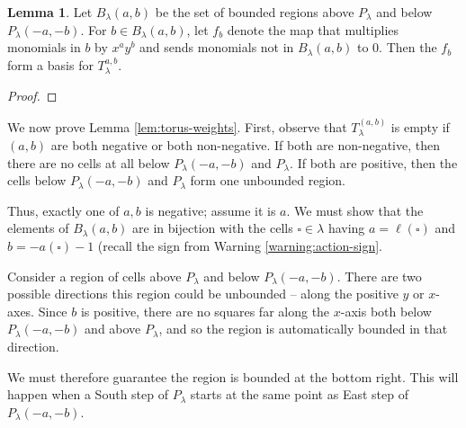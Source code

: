 \documentclass{amsart}[12pt]
\theoremstyle{definition}
\newtheorem{lemma}[dummy]{Lemma}
\begin{document}
\begin{lemma} Let $B_\lambda(a,b)$ be the set of bounded regions above $P_\lambda$ and below $P_\lambda(-a,-b)$.  For $b\in B_\lambda(a,b)$, let $f_b$ denote the map that multiplies monomials in $b$ by $x^ay^b$ and sends monomials not in $B_\lambda(a,b)$ to $0$.  Then the $f_b$ form a basis for $T_\lambda^{a,b}$.
\end{lemma}

\begin{proof}


\end{proof}


We now prove Lemma \ref{lem:torus-weights}.  First, observe that $T_\lambda^{(a,b)}$ is empty if $(a,b)$ are both negative or both non-negative.  If both are non-negative, then there are no cells at all below $P_\lambda(-a,-b)$ and $P_\lambda$.  If both are positive, then the cells below $P_\lambda(-a,-b)$ and $P_\lambda$ form one unbounded region.  



Thus, exactly one of $a,b$ is negative; assume it is $a$.  We must show that the elements of $B_\lambda(a,b)$ are in bijection with the cells $\square\in\lambda$ having  $a=\ell(\square)$ and $b=-a(\square)-1$ (recall the sign from Warning \ref{warning:action-sign}.

Consider a region of cells above $P_\lambda$ and below $P_\lambda(-a,-b)$.  There are two possible directions this region could be unbounded -- along the positive $y$ or $x$-axes.  Since $b$ is positive, there are no squares far along the $x$-axis both below $P_\lambda(-a,-b)$  and above $P_\lambda$, and so the region is automatically bounded in that direction.  

We must therefore guarantee the region is bounded at the bottom right.  This will happen when a South step of $P_\lambda$ starts at the same point as East step of $P_\lambda(-a,-b)$.  
\end{document}
